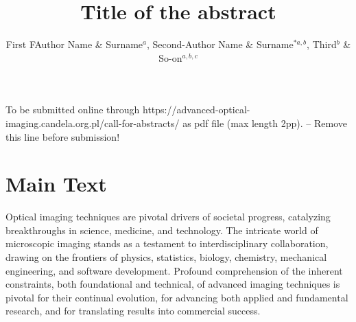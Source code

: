 \documentclass[10pt, twoside, a4paper]{article}
\begin{document}
{
    \fancyhead{}
   
}

\thispagestyle{firststyle}
\fancyhf{}
\renewcommand{\headrulewidth}{0pt}
\renewcommand{\footrulewidth}{0pt}
\renewcommand{\footskip}{50pt}

\pagestyle{fancy}

{\vspace*{3mm}\color{color_261472}\fontsize{10}{10.5}\selectfont To be submitted online through https://advanced-optical-imaging.candela.org.pl/call-for-abstracts/ as pdf file (max length 2pp). -- Remove this line before submission!}



\title{Title of the abstract}


\author{
First FAuthor Name \& Surname$^{a}$, Second-Author Name \& Surname$^{\ast a,b}$, Third$^{b}$ \& So-on$^{a,b,c}$
}

\address{
    $^{a}$Institution, address, Country \\
    $^{b}$Institution, address, Country \\
    $^{c}$Institution, address, Country \\
    $^{\#}$corresponding author email:  author@author.com \\
    $^{\ast}$Presenting author
	}


\section{Main Text}
Optical imaging techniques are pivotal drivers of societal progress, catalyzing breakthroughs in science, medicine, and technology. The intricate world of microscopic imaging stands as a testament to interdisciplinary collaboration, drawing on the frontiers of physics, statistics, biology, chemistry, mechanical engineering, and software development. Profound comprehension of the inherent constraints, both foundational and technical, of advanced imaging techniques is pivotal for their continual evolution, for advancing both applied and fundamental research, and for translating results into commercial success.
\end{document}
